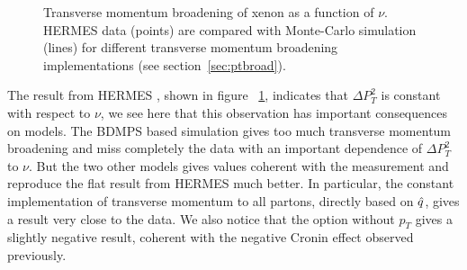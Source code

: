 \begin{figure}[tbp]
  \centering
{}
\caption {Transverse momentum broadening of xenon as a function of $\nu$. 
HERMES data \cite{Airapetian:2009jy} (points) are compared with Monte-Carlo 
simulation (lines) for different transverse momentum broadening implementations 
(see section~\ref{sec:ptbroad}).}
\label{fig:PtC-PtNu}
\end{figure}

The result from HERMES \cite{Airapetian:2009jy}, shown in figure~%
\ref{fig:PtC-PtNu}, indicates that $\Delta P_T^2$ is constant with respect to 
$\nu$, we see here that this observation has important consequences on models. 
The BDMPS based simulation gives too much transverse momentum broadening and 
miss completely the data with an important dependence of $\Delta P_T^2$ to 
$\nu$. But the two other models gives values coherent with the measurement and 
reproduce the flat result from HERMES much better. In particular, the constant 
implementation of transverse momentum to all partons, directly based on 
${\hat q}$, gives a result very close to the data. We also notice that the option 
without $p_T$ gives a slightly negative result, coherent with the negative 
Cronin effect observed previously.

